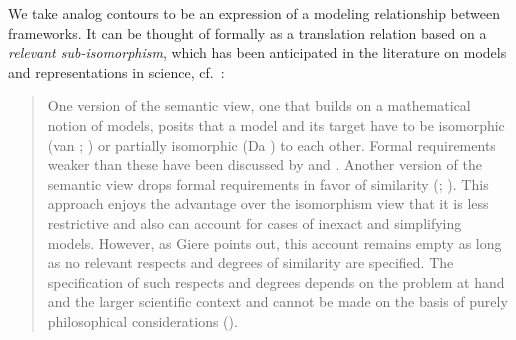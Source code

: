 \documentclass[11pt, oneside]{article}   	%
\begin{document}

%


We take analog contours to be an expression of a modeling relationship between frameworks.  It can be thought of formally as a translation relation based on a \emph{relevant sub-isomorphism}, which has been anticipated in the literature on models and representations in science, cf.\ \cite{SEP2012}:


\begin{quote}

One version of the semantic view, one that builds on a mathematical notion of models, posits that a model and its target have to be isomorphic (van \cite{vanFraassen1980}; \cite{Suppes2002}) or partially isomorphic (Da \cite{DaCostaetal2003}) to each other. Formal requirements weaker than these have been discussed by \cite{Mundy1986} and \cite{Swoyer1991}. Another version of the semantic view drops formal requirements in favor of similarity (\cite{Giere1988,Giere2004}; \cite{Teller2001}). This approach enjoys the advantage over the isomorphism view that it is less restrictive and also can account for cases of inexact and simplifying models. However, as Giere points out, this account remains empty as long as no relevant respects and degrees of similarity are specified. The specification of such respects and degrees depends on the problem at hand and the larger scientific context and cannot be made on the basis of purely philosophical considerations (\cite{Teller2001}).
\end{quote}
\end{document}
